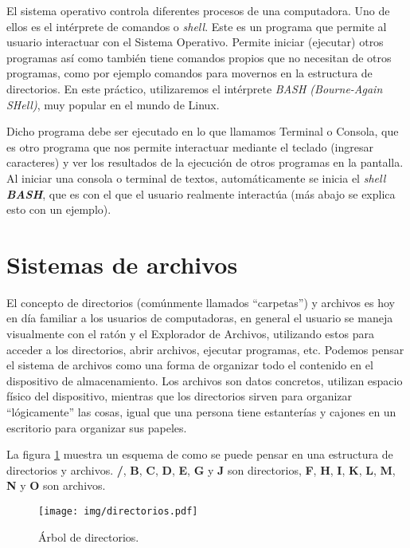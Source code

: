 \documentclass[12pt]{article}
\newcommand{\bash}{\textbf{\emph{BASH}}}
\begin{document}
El sistema operativo controla diferentes procesos de una computadora. Uno de
ellos es el intérprete de comandos o \emph{shell}. Este es un programa que
permite al usuario interactuar con el Sistema Operativo. Permite iniciar
(ejecutar) otros programas así como también tiene comandos propios que no
necesitan de otros programas, como por ejemplo comandos para movernos en la
estructura de directorios. En este práctico, utilizaremos el intérprete
\emph{BASH (Bourne-Again SHell)}, muy popular en el mundo de Linux.

Dicho programa debe ser ejecutado en lo que llamamos Terminal o Consola, que
es otro programa que nos permite interactuar mediante el teclado (ingresar
caracteres) y ver los resultados de la ejecución de otros programas en la
pantalla. Al iniciar una consola o terminal de textos, automáticamente se
inicia el \emph{shell} \bash, que es con el que el usuario realmente
interactúa (más abajo se explica esto con un ejemplo).

\section{Sistemas de archivos}

El concepto de directorios (comúnmente llamados ``carpetas'') y archivos es
hoy en día familiar a los usuarios de computadoras, en general el usuario se
maneja visualmente con el ratón y el Explorador de Archivos, utilizando estos
para acceder a los directorios, abrir archivos, ejecutar programas, etc.
Podemos pensar el sistema de archivos como una forma de organizar todo el
contenido en el dispositivo de almacenamiento. Los archivos son datos
concretos, utilizan espacio físico del dispositivo, mientras que los
directorios sirven para organizar ``lógicamente'' las cosas, igual que una
persona tiene estanterías y cajones en un escritorio para organizar sus
papeles.

La figura \ref{arbolDirectorios} muestra un esquema de como se puede pensar en
una estructura de directorios y archivos. \textbf{/}, \textbf{B}, \textbf{C},
\textbf{D}, \textbf{E}, \textbf{G} y \textbf{J} son directorios, \textbf{F},
\textbf{H}, \textbf{I}, \textbf{K}, \textbf{L}, \textbf{M}, \textbf{N} y
\textbf{O} son archivos.

\begin{figure}[!htb]

    \centering

    \texttt{[image: img/directorios.pdf]}

    \caption{Árbol de directorios.}

    \label{arbolDirectorios}

\end{figure}
\end{document}
